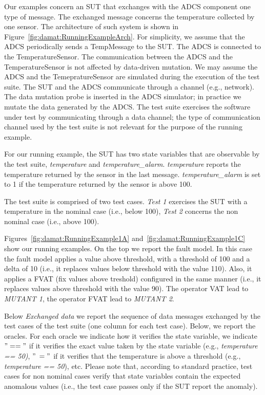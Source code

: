 Our examples concern an SUT that exchanges with the ADCS component one type of message. The exchanged message concerns the temperature collected by one sensor. The architecture of such system is shown in Figure~\ref{fig:damat:RunningExampleArch}. For simplicity, we assume that the ADCS periodically sends a TempMessage to the SUT. The ADCS is connected to the TemperatureSensor. The communication between the ADCS and the TemperatureSensor is not affected by data-driven mutation. We may assume the ADCS and the TemepratureSensor are simulated during the execution of the test suite. The SUT and the ADCS communicate through a channel 
(e.g., network). The data mutation probe is inserted in the ADCS simulator; in practice we mutate the data generated by the ADCS. The test suite exercises the software under test by communicating through a data channel; the type of communication channel used by the test suite is not relevant for the purpose of the running example.

For our running example, the SUT has two state variables that are observable by the test suite, \emph{temperature} and \emph{temperature\_alarm}. \emph{temperature} reports the temperature returned by the sensor in the last message. 
\emph{temperature\_alarm} is set to 1 if the temperature returned by the sensor is above 100.

The test suite is comprised of two test cases. \emph{Test 1} exercises the SUT with a temperature in the nominal case (i.e., below 100), \emph{Test 2} concerns the non nominal case (i.e., above 100).

Figures~\ref{fig:damat:RunningExample1A} and~\ref{fig:damat:RunningExample1C} show our running examples. On the top we report the fault model. In this case the fault model applies a value above threshold, with a threshold of 100 and a delta of 10 (i.e., it replaces values below threshold with the value 110). Also, it applies a FVAT (fix values above treshold) configured in the same manner (i.e., it replaces values above threshold with the value 90). The operator VAT lead to \emph{MUTANT 1}, the operator FVAT lead to \emph{MUTANT 2}.

Below \emph{Exchanged data} we report the sequence of data messages exchanged by the test cases of the test suite (one column for each test case).
Below, we report the oracles. For each oracle we indicate how it verifies the state variable, we indicate $"=="$ if it verifies the exact value taken by the state variable (e.g., \emph{temperature == 50)}, $"\>="$ if it verifies that the temperature is above a threshold (e.g., \emph{temperature == 50}), etc. Please note that, according to standard practice, test cases for non nominal cases verify that state variables contain the expected anomalous values (i.e., the test case passes only if the SUT report the anomaly). 

